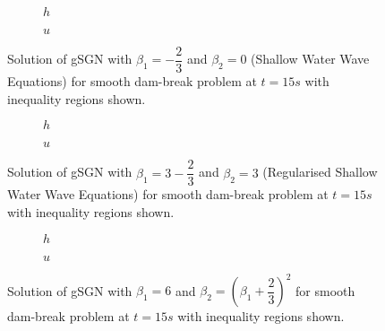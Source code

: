 \documentclass[10pt]{article}
\begin{document}
\begin{figure}
	\centering
	\begin{subfigure}{0.49\textwidth}
		\centering
		
		\caption{$h$}
	\end{subfigure}
	\begin{subfigure}{0.49\textwidth}
		\centering
		
		\caption{$u$}
	\end{subfigure}
	\caption{Solution of gSGN with $\beta_1 = -\dfrac{2}{3} $ and $\beta_2 = 0$ (Shallow Water Wave Equations) for smooth dam-break problem at $t=15s$ with inequality regions shown.}
	\label{fig:SWWESDB}
\end{figure}

\begin{figure}
	\centering
	\begin{subfigure}{0.49\textwidth}
		\centering
		
		\caption{$h$}
	\end{subfigure}
	\begin{subfigure}{0.49\textwidth}
		\centering
		
		\caption{$u$}
	\end{subfigure}
	\caption{Solution of gSGN with $\beta_1 = 3 -\dfrac{2}{3} $ and $\beta_2 = 3$ (Regularised Shallow Water Wave Equations) for smooth dam-break problem at $t=15s$ with inequality regions shown.}
	\label{fig:RegSWWESDB}
\end{figure}

\begin{figure}
	\centering
	\begin{subfigure}{0.49\textwidth}
		\centering
		
		\caption{$h$}
	\end{subfigure}
	\begin{subfigure}{0.49\textwidth}
		\centering
		
		\caption{$u$}
	\end{subfigure}
	\caption{Solution of gSGN with $\beta_1 = 6 $ and $\beta_2 = \left(\beta_1 + \dfrac{2}{3}\right)^2$ for smooth dam-break problem at $t=15s$ with inequality regions shown.}
	\label{fig:Reg2SDB}
\end{figure}









\end{document}
